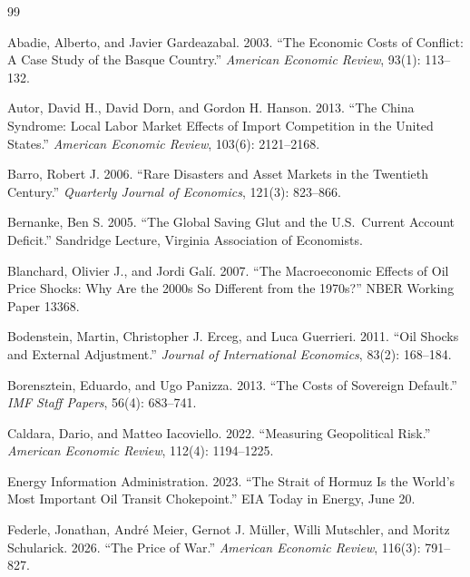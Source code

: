 \documentclass[12pt,a4paper]{article}
\begin{document}
\newpage


\begin{thebibliography}{99}

Abadie, Alberto, and Javier Gardeazabal. 2003. ``The Economic Costs of Conflict: A Case Study of the Basque Country.'' \textit{American Economic Review}, 93(1): 113--132.

Autor, David H., David Dorn, and Gordon H. Hanson. 2013. ``The China Syndrome: Local Labor Market Effects of Import Competition in the United States.'' \textit{American Economic Review}, 103(6): 2121--2168.

Barro, Robert J. 2006. ``Rare Disasters and Asset Markets in the Twentieth Century.'' \textit{Quarterly Journal of Economics}, 121(3): 823--866.

Bernanke, Ben S. 2005. ``The Global Saving Glut and the U.S.\ Current Account Deficit.'' Sandridge Lecture, Virginia Association of Economists.

Blanchard, Olivier J., and Jordi Gal\'{i}. 2007. ``The Macroeconomic Effects of Oil Price Shocks: Why Are the 2000s So Different from the 1970s?'' NBER Working Paper 13368.

Bodenstein, Martin, Christopher J. Erceg, and Luca Guerrieri. 2011. ``Oil Shocks and External Adjustment.'' \textit{Journal of International Economics}, 83(2): 168--184.

Borensztein, Eduardo, and Ugo Panizza. 2013. ``The Costs of Sovereign Default.'' \textit{IMF Staff Papers}, 56(4): 683--741.

Caldara, Dario, and Matteo Iacoviello. 2022. ``Measuring Geopolitical Risk.'' \textit{American Economic Review}, 112(4): 1194--1225.

Energy Information Administration. 2023. ``The Strait of Hormuz Is the World's Most Important Oil Transit Chokepoint.'' EIA Today in Energy, June 20.

Federle, Jonathan, Andr\'{e} Meier, Gernot J. M\"{u}ller, Willi Mutschler, and Moritz Schularick. 2026. ``The Price of War.'' \textit{American Economic Review}, 116(3): 791--827.


\end{thebibliography}
\end{document}
